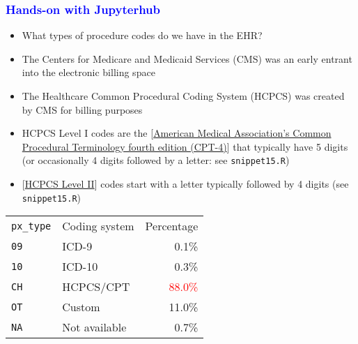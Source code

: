 \documentclass[11pt,pdftex,dvipsnames,usenames]{beamer}
\begin{document}
\begin{frame}[fragile]\frametitle{\bf\textcolor{blue}{Hands-on with Jupyterhub}}
\begin{itemize}
\item What types of procedure codes do we have in the EHR? \\ 
\item The Centers for Medicare and Medicaid Services (CMS)
was an early entrant into the electronic billing space
\item The Healthcare Common Procedural Coding System (HCPCS)
was created by CMS for billing purposes
\item HCPCS Level I codes are the \textcolor{PineGreen}{[\href{https://www.ama-assn.org/amaone/cpt-current-procedural-terminology}{American
Medical Association's Common Procedural Terminology
fourth edition (CPT-4)}]} that typically have 5 digits
(or occasionally 4 digits followed by a letter: see \texttt{snippet15.R}) 
\item \textcolor{PineGreen}{[\href{https://www.cms.gov/Medicare/Coding/HCPCSReleaseCodeSets/Alpha-Numeric-HCPCS}{HCPCS Level II}]} codes start with a letter 
typically followed by 4 digits (see \texttt{snippet15.R})
\end{itemize}

\begin{tabular}{llr}
\texttt{px\_type} & Coding system & Percentage \\
\texttt{09} & ICD-9  & 0.1\% \\
\texttt{10} & ICD-10 & 0.3\% \\
\texttt{CH} & HCPCS/CPT & \textcolor{red}{88.0\%} \\
\texttt{OT} & Custom & 11.0\% \\
\texttt{NA} & Not available & 0.7\%
\end{tabular}
\end{frame}
\end{document}
